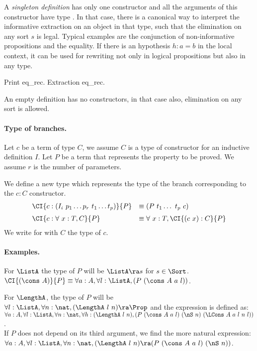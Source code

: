 
A {\em singleton
definition} has only one constructor and all the arguments of this
constructor have type \Prop. In that case, there is a canonical
way to interpret the informative extraction on an object in that type,
such that the elimination on any sort $s$ is legal.  Typical examples are
the conjunction of non-informative propositions and the equality. 
If there is an hypothesis $h:a=b$ in the local context, it can be used for
rewriting not only in logical propositions but also in any type.
\begin{coq_example}
Print eq_rec.
Extraction eq_rec.
\end{coq_example}
An empty definition has no constructors, in that case also,
elimination on any sort is allowed.

\paragraph{Type of branches.}
Let $c$ be a term of type $C$, we assume $C$ is a type of constructor
for an inductive definition $I$. Let $P$ be a term that represents the
property to be proved.
We assume $r$ is the number of parameters.

We define a new type  which represents the type of the
branch corresponding to the $c:C$ constructor.
\[
\begin{array}{ll}
\CI{c:(I_i~p_1\ldots p_r\ t_1 \ldots t_p)}{P} &\equiv (P~t_1\ldots ~t_p~c) \\[2mm]
\CI{c:\forall~x:T,C}{P} &\equiv \forall~x:T,\CI{(c~x):C}{P} 
\end{array}
\]
We write  for  with $C$ the type of $c$.

\paragraph{Examples.}
For $\ListA$ the type of $P$ will be $\ListA\ra s$ for $s \in \Sort$. \\ 
$ \CI{(\cons~A)}{P} \equiv
\forall a:A, \forall l:\ListA,(P~(\cons~A~a~l))$.

For $\LengthA$, the type of $P$ will be
$\forall l:\ListA,\forall n:\nat, (\LengthA~l~n)\ra \Prop$ and the expression
 is defined as:\\ 
$\forall a:A, \forall l:\ListA, \forall n:\nat, \forall
h:(\LengthA~l~n), (P~(\cons~A~a~l)~(\nS~n)~(\LCons~A~a~l~n~l))$.\\ 
If $P$ does not depend on its third argument, we find the more natural
expression:\\ 
$\forall a:A, \forall l:\ListA, \forall n:\nat,
(\LengthA~l~n)\ra(P~(\cons~A~a~l)~(\nS~n))$.

